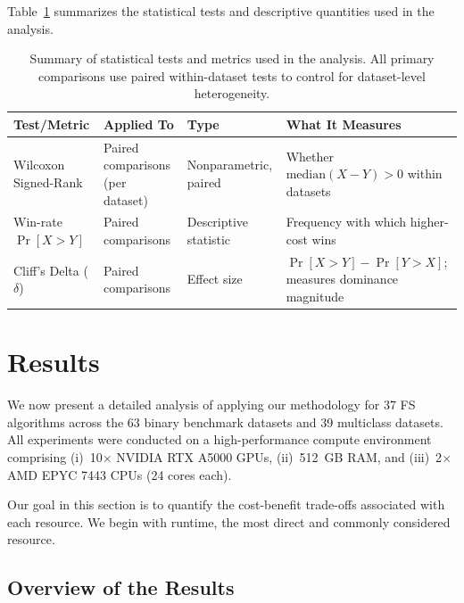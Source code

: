 \documentclass[preprint,12pt,authoryear]{elsarticle}
\begin{document}
{Table~\ref{tab:stat_tests_summary} summarizes the statistical tests and descriptive quantities used in the analysis.

\begin{table}[t]
\centering
\footnotesize
\renewcommand{\arraystretch}{1.2}
\setlength{\tabcolsep}{4pt}

\begin{tabularx}{\linewidth}{
>{\raggedright\arraybackslash}p{2.5cm}
>{\raggedright\arraybackslash}p{3.2cm}
>{\raggedright\arraybackslash}p{2.8cm}
>{\raggedright\arraybackslash}X}
\toprule
\textbf{Test/Metric} & \textbf{Applied To} & \textbf{Type} & \textbf{What It Measures} \\
\midrule

Wilcoxon Signed-Rank
& Paired comparisons (per dataset)
& Nonparametric, paired
& Whether $\mathrm{median}(X - Y) > 0$ within datasets \\

Win-rate $\Pr[X > Y]$
& Paired comparisons
& Descriptive statistic
& Frequency with which higher-cost wins \\

Cliff's Delta ($\delta$)
& Paired comparisons
& Effect size
& $\Pr[X > Y] - \Pr[Y > X]$; measures dominance magnitude \\

\bottomrule
\end{tabularx}

\caption{Summary of statistical tests and metrics used in the analysis. All primary comparisons use paired within-dataset tests to control for dataset-level heterogeneity.}
\label{tab:stat_tests_summary}
\end{table}

\section{Results}\label{sec:results}
We now present a detailed analysis of applying our methodology for 37 FS algorithms across the 63 binary benchmark datasets and 39 multiclass datasets. All experiments were conducted on a high-performance compute environment comprising (i)~10$\times$ NVIDIA RTX A5000 GPUs, (ii)~512~GB RAM, and (iii)~2$\times$ AMD EPYC 7443 CPUs (24 cores each).

Our goal in this section is to quantify the cost-benefit trade-offs associated with each resource. We begin with runtime, the most direct and commonly considered resource.

\subsection{Overview of the Results}\label{sec:results_overview}

}
\end{document}
